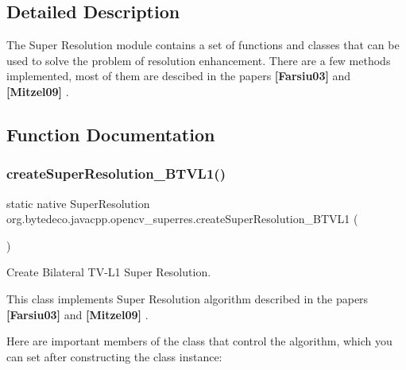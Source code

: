 \subsection{Detailed Description}
The Super Resolution module contains a set of functions and classes that can be used to solve the problem of resolution enhancement. There are a few methods implemented, most of them are descibed in the papers {\bfseries [Farsiu03]} and {\bfseries [Mitzel09]} . 

\subsection{Function Documentation}
\mbox{\label{group__superres_gac2dfc5e8422832bbb249c6675e7cb851}} 
\subsubsection{\texorpdfstring{create\+Super\+Resolution\+\_\+\+B\+T\+V\+L1()}{createSuperResolution\_BTVL1()}}
{\footnotesize\ttfamily static native Super\+Resolution org.\+bytedeco.\+javacpp.\+opencv\+\_\+superres.\+create\+Super\+Resolution\+\_\+\+B\+T\+V\+L1 (\begin{DoxyParamCaption}{ }\end{DoxyParamCaption})\hspace{0.3cm}{\ttfamily [static]}}



Create Bilateral T\+V-\/\+L1 Super Resolution. 

This class implements Super Resolution algorithm described in the papers {\bfseries [Farsiu03]} and {\bfseries [Mitzel09]} . 

Here are important members of the class that control the algorithm, which you can set after constructing the class instance\+: 


